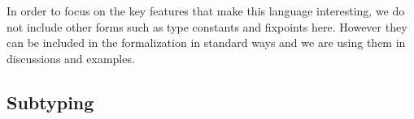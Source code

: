 In order to focus on the key features that make this language interesting, we do
not include other forms such as type constants and fixpoints here. 
However they can be included in the formalization in
standard ways and we are using them in discussions and examples. %


\subsection{Subtyping}



%
%
%

